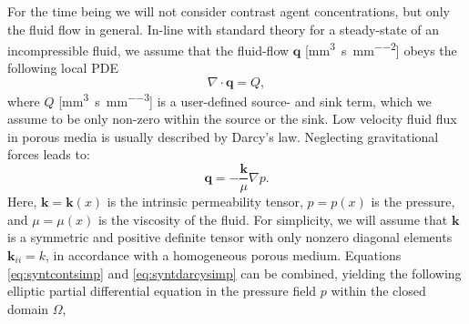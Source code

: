 \documentclass[journal,twocolumn]{IEEEtran}
\newcommand{\vq}{\mathbf{q}}
\newcommand{\siQmm}{\milli\meter\cubed\per\second\per\milli\meter\cubed}
\newcommand{\siq}{\milli\meter\cubed\per\second\per\milli\meter\squared}
\newcommand{\siQtilde}{\milli\gram\per\second\per\milli\meter\cubed}
\begin{document}
	For the time being we will not consider contrast agent concentrations, but only the fluid flow in general.
	In-line with standard theory for a steady-state of an incompressible fluid, we assume that the fluid-flow $\vq$ [\si{\siq}] obeys the following local PDE
	\begin{equation}
		\nabla \cdot \vq = Q,
		\label{eq:syntcontsimp}
	\end{equation}	
	where $Q$ [\si{\siQmm}] is a user-defined source- and sink term, which we assume to be only non-zero within the source or the sink.
	Low velocity fluid flux in porous media is usually described by Darcy's law. 	Neglecting gravitational forces \cite{Darcy56} leads to:
	\begin{equation}
		\vq = -\frac{\mathbf{k}}{\mu} \nabla p.
		\label{eq:syntdarcysimp}
	\end{equation}
	Here, $\mathbf{k} = \mathbf{k}(x)$ is the intrinsic permeability tensor, $p=p(x)$ is the pressure, and $\mu = \mu(x)$ is the viscosity of the fluid. 	
	For simplicity, we will assume that $\mathbf{k}$ is a symmetric and positive definite tensor with only nonzero diagonal elements $\mathbf{k}_{ii} = k$, in accordance with a homogeneous porous medium.	
	Equations \eqref{eq:syntcontsimp} and \eqref{eq:syntdarcysimp} can be combined, yielding the following elliptic partial differential equation in the pressure field $p$ within the closed domain $\Omega$,
\end{document}

